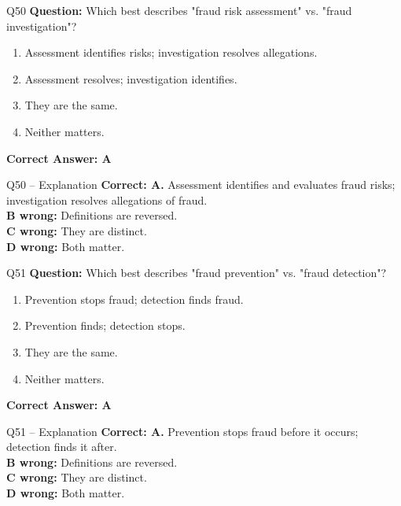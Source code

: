 \documentclass[aspectratio=169,10pt]{beamer}
\begin{document}
	\begin{frame}[t]{Q50}
		\small
		\textbf{Question:} Which best describes "fraud risk assessment" vs. "fraud investigation"?
		\begin{enumerate}[label=\Alph*.,itemsep=1pt,topsep=2pt]
			\item Assessment identifies risks; investigation resolves allegations.
			\item Assessment resolves; investigation identifies.
			\item They are the same.
			\item Neither matters.
		\end{enumerate}
		\vspace{4pt}
		\textbf{Correct Answer: A}
	\end{frame}
	
	\begin{frame}[t]{Q50 -- Explanation}
		\small
		\textbf{Correct: A.} Assessment identifies and evaluates fraud risks; investigation resolves allegations of fraud. \\[4pt]
		\textbf{B wrong:} Definitions are reversed. \\[2pt]
		\textbf{C wrong:} They are distinct. \\[2pt]
		\textbf{D wrong:} Both matter.
	\end{frame}
	
	\begin{frame}[t]{Q51}
		\small
		\textbf{Question:} Which best describes "fraud prevention" vs. "fraud detection"?
		\begin{enumerate}[label=\Alph*.,itemsep=1pt,topsep=2pt]
			\item Prevention stops fraud; detection finds fraud.
			\item Prevention finds; detection stops.
			\item They are the same.
			\item Neither matters.
		\end{enumerate}
		\vspace{4pt}
		\textbf{Correct Answer: A}
	\end{frame}
	
	\begin{frame}[t]{Q51 -- Explanation}
		\small
		\textbf{Correct: A.} Prevention stops fraud before it occurs; detection finds it after. \\[4pt]
		\textbf{B wrong:} Definitions are reversed. \\[2pt]
		\textbf{C wrong:} They are distinct. \\[2pt]
		\textbf{D wrong:} Both matter.
	\end{frame}
	
\end{document}
